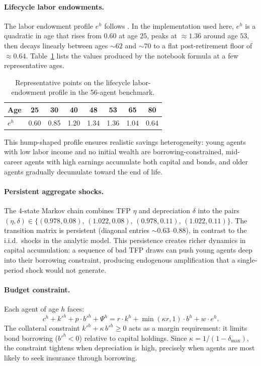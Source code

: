 \documentclass[11pt,a4paper]{report}
\begin{document}
\paragraph{Lifecycle labor endowments.}
The labor endowment profile $e^h$ follows \citet{BKS1}.  In the implementation used here, $e^h$ is a quadratic in age that rises from $0.60$ at age $25$, peaks at $\approx 1.36$ around age $53$, then decays linearly between ages $\sim 62$ and $\sim 70$ to a flat post-retirement floor of $\approx 0.64$.  Table~\ref{tab:olg56_labor_profile} lists the values produced by the notebook formula at a few representative ages.
\begin{table}[ht]
\centering
\small
\begin{tabular}{l*{7}{c}}
\toprule
Age & 25 & 30 & 40 & 48 & 53 & 65 & 80 \\
\midrule
$e^h$ & 0.60 & 0.85 & 1.20 & 1.34 & 1.36 & 1.04 & 0.64 \\
\bottomrule
\end{tabular}
\caption{Representative points on the lifecycle labor-endowment profile in the 56-agent benchmark.}
\label{tab:olg56_labor_profile}
\end{table}
This hump-shaped profile ensures realistic savings heterogeneity: young agents with low labor income and no initial wealth are borrowing-constrained, mid-career agents with high earnings accumulate both capital and bonds, and older agents gradually decumulate toward the end of life.

\paragraph{Persistent aggregate shocks.}
The 4-state Markov chain combines TFP $\eta$ and depreciation $\delta$ into the pairs $(\eta,\delta) \in \{(0.978, 0.08),\, (1.022, 0.08),\, (0.978, 0.11),\, (1.022, 0.11)\}$.  The transition matrix is persistent (diagonal entries $\sim$0.63--0.88), in contrast to the i.i.d.\ shocks in the analytic model.  This persistence creates richer dynamics in capital accumulation: a sequence of bad TFP draws can push young agents deep into their borrowing constraint, producing endogenous amplification that a single-period shock would not generate.

\paragraph{Budget constraint.}
Each agent of age $h$ faces:
\begin{equation}
c^h + k'^h + p\cdot b'^h + \Psi^h = r\cdot k^h + \min(\kappa r,1)\cdot b^h + w\cdot e^h.
\end{equation}
The collateral constraint $k'^h + \kappa\,b'^h \geq 0$ acts as a margin requirement: it limits bond borrowing ($b'^h < 0$) relative to capital holdings.  Since $\kappa = 1/(1-\delta_{\max})$, the constraint tightens when depreciation is high, precisely when agents are most likely to seek insurance through borrowing.
\end{document}
